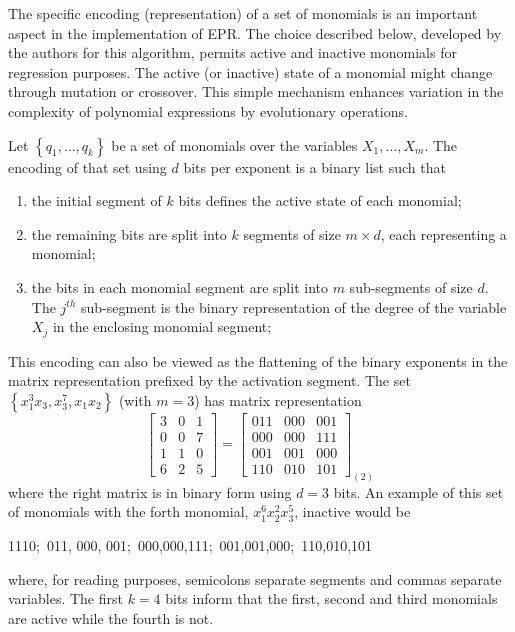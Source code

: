 \documentclass[review,preprint]{elsarticle}
\newcommand{\nth}{\ensuremath{^{th}}}
\newcommand{\revised}[2]{}
\begin{document}
The specific encoding (representation) of a set of monomials is an important aspect in the implementation of \ac{EPR}. The choice described below, developed by the authors for this algorithm, permits active and inactive monomials for regression purposes\revised{is this an original contribution????  Otherwise it needs a reference.}{it is ours}. The active (or inactive) state of a monomial might change through mutation or crossover. This simple mechanism enhances variation in the complexity of polynomial expressions by evolutionary operations.

Let  $\left\lbrace q_1, \ldots, q_k\right\rbrace$ be a set of monomials over the variables $X_1, \ldots, X_m$. The encoding of that set using $d$ bits per exponent is a binary list such that
\begin{enumerate}
\item the initial segment of $k$ bits defines the active state of each monomial;
\item the remaining bits are split into $k$ segments of size $m\times d$, each representing a monomial;
\item the bits in each monomial segment are split into $m$ sub-segments of size $d$. The $j\nth$ sub-segment is the binary representation of the degree of the variable $X_j$ in the enclosing monomial segment;
\end{enumerate}
This encoding can also be viewed as the flattening of the binary exponents in the matrix representation prefixed by the activation segment. The set $\left\lbrace x_1^3 x_3, x_3^7, x_1 x_2\right\rbrace$ (with $m = 3$) has matrix representation
$$\left[ 
\begin{array}{ccc}
3 & 0 & 1 \\
0 & 0 & 7 \\
1 & 1 & 0 \\
6 & 2 & 5
\end{array}
\right] = \left[ 
\begin{array}{ccc}
011 & 000 & 001 \\
000 & 000 & 111 \\
001 & 001 & 000 \\
110 & 010 & 101
\end{array}
\right]_{\left( 2 \right)}
$$
where the right matrix is in binary form using $d = 3$ bits. An example of this set of monomials with the forth monomial, $x_1^6x_2^2x_3^5$, inactive would be
\begin{center}
1110;~011, 000, 001;~000,000,111;~001,001,000;~110,010,101
\end{center}
where, for reading purposes, semicolons separate segments and commas separate variables. The first $k=4$ bits inform that the first, second and third monomials are active while the fourth is not.
\end{document}
